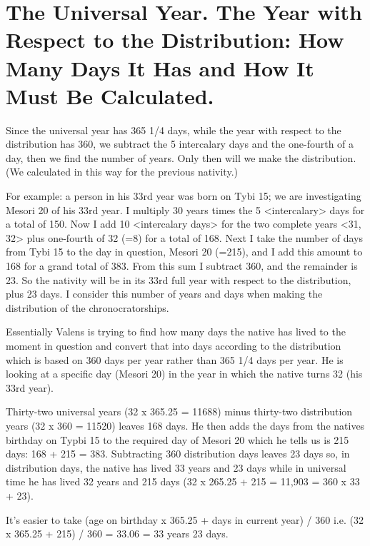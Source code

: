 \section{The Universal Year. The Year with Respect to the Distribution: How Many Days It Has and How It Must Be Calculated.}

Since the universal year has 365 1/4 days, while the year with respect to the distribution has 360, we subtract the 5 intercalary days and the one-fourth of a day, then we find the number of years. Only then will we make the distribution. (We calculated in this way for the previous nativity.) 

For example: a person in his 33rd year was born on Tybi 15; we are investigating Mesori 20 of his 33rd year. I multiply 30 years
times the 5 <intercalary> days for a total of 150. Now I add 10 <intercalary days> for the two complete years <31, 32> plus one-fourth of 32 (=8) for a total of 168. Next I take the number of days from Tybi 15 to the day in question, Mesori 20 (=215), and I add this amount to 168 for a grand total of 383. From this sum I subtract 360, and the remainder is 23. So the nativity will be in its 33rd full year with respect to the distribution, plus 23 days. I consider this number of years and days when making the distribution of the chronocratorships.

\begin{mdframed}[backgroundcolor=cyan!5]
\scriptsize
Essentially Valens is trying to find how many days the native has lived to the moment in question and convert that into days according to the distribution which is based on 360 days per year rather than 365 1/4 days per year. He is looking at a specific day (Mesori 20) in the year in which the native turns 32 (his 33rd year).

Thirty-two universal years (32 x 365.25 = 11688) minus thirty-two distribution years (32 x 360 = 11520) leaves 168 days. He then adds the days from the natives birthday on Typbi 15 to the required day of Mesori 20 which he tells us is 215 days: 168 + 215 = 383. Subtracting 360 distribution days leaves 23 days so, in distribution days, the native has lived 33 years and 23 days while in universal time he has lived 32 years and 215 days (32 x 265.25 + 215 = 11,903 = 360 x 33 + 23). 

It's easier to take (age on birthday x 365.25 + days in current year) / 360 i.e. (32 x 365.25 + 215) / 360 = 33.06 = 33 years 23 days.

\end{mdframed}

\newpage